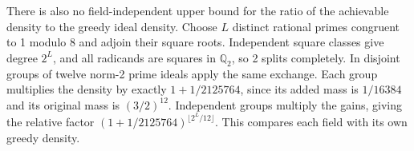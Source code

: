There is also no field-independent upper bound for the ratio of the achievable density to the greedy ideal density. Choose $L$ distinct rational primes congruent to 1 modulo 8 and adjoin their square roots. Independent square classes give degree $2^L$, and all radicands are squares in $\mathbb Q_2$, so 2 splits completely. In disjoint groups of twelve norm-2 prime ideals apply the same exchange. Each group multiplies the density by exactly $1+1/2125764$, since its added mass is $1/16384$ and its original mass is $(3/2)^{12}$. Independent groups multiply the gains, giving the relative factor $(1+1/2125764)^{\lfloor 2^L/12\rfloor}$. This compares each field with its own greedy density.
